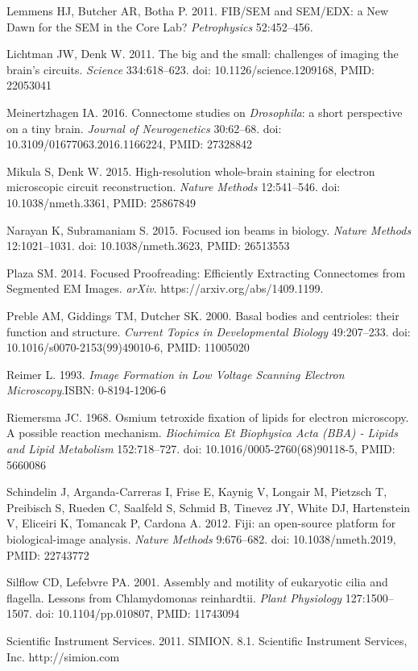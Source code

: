 \documentclass{article}
\begin{document}
\begin{hangpars}
Lemmens HJ, Butcher AR, Botha P. 2011. FIB/SEM and SEM/EDX: a New Dawn for the SEM in the Core Lab? \emph{Petrophysics} 52:452–456.

Lichtman JW, Denk W. 2011. The big and the small: challenges of imaging the brain’s circuits. \emph{Science} 334:618–623. doi: 10.1126/science.1209168, PMID: 22053041

Meinertzhagen IA. 2016. Connectome studies on \emph{Drosophila}: a short perspective on a tiny brain. \emph{Journal of Neurogenetics} 30:62–68. doi: 10.3109/01677063.2016.1166224, PMID: 27328842

Mikula S, Denk W. 2015. High-resolution whole-brain staining for electron microscopic circuit reconstruction. \emph{Nature Methods} 12:541–546. doi: 10.1038/nmeth.3361, PMID: 25867849

Narayan K, Subramaniam S. 2015. Focused ion beams in biology. \emph{Nature Methods} 12:1021–1031. doi: 10.1038/nmeth.3623, PMID: 26513553

Plaza SM. 2014. Focused Proofreading: Efficiently Extracting Connectomes from Segmented EM Images. \emph{arXiv}. https://arxiv.org/abs/1409.1199.

Preble AM, Giddings TM, Dutcher SK. 2000. Basal bodies and centrioles: their function and structure. \emph{Current Topics in Developmental Biology} 49:207–233. doi: 10.1016/s0070-2153(99)49010-6, PMID: 11005020

Reimer L. 1993. \emph{Image Formation in Low Voltage Scanning Electron Microscopy}.ISBN: 0-8194-1206-6

Riemersma JC. 1968. Osmium tetroxide fixation of lipids for electron microscopy. A possible reaction mechanism. \emph{Biochimica Et Biophysica Acta (BBA) - Lipids and Lipid Metabolism} 152:718–727. doi: 10.1016/0005-2760(68)90118-5, PMID: 5660086

Schindelin J, Arganda-Carreras I, Frise E, Kaynig V, Longair M, Pietzsch T, Preibisch S, Rueden C, Saalfeld S, Schmid B, Tinevez JY, White DJ, Hartenstein V, Eliceiri K, Tomancak P, Cardona A. 2012. Fiji: an open-source platform for biological-image analysis. \emph{Nature Methods} 9:676–682. doi: 10.1038/nmeth.2019, PMID: 22743772

Silflow CD, Lefebvre PA. 2001. Assembly and motility of eukaryotic cilia and flagella. Lessons from Chlamydomonas reinhardtii. \emph{Plant Physiology} 127:1500–1507. doi: 10.1104/pp.010807, PMID: 11743094

Scientific Instrument Services. 2011. SIMION. 8.1. Scientific Instrument Services, Inc. http://simion.com


\end{hangpars}
\end{document}
